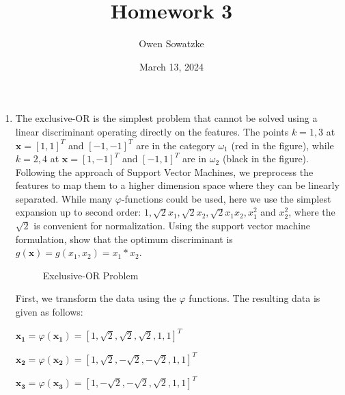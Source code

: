 \documentclass[fleqn]{article}
\title{Homework 3}
\author{Owen Sowatzke}
\date{March 13, 2024}
\newcommand{\zerodisplayskip}{
	\setlength{\abovedisplayskip}{0pt}%
	\setlength{\belowdisplayskip}{0pt}%
	\setlength{\abovedisplayshortskip}{0pt}%
	\setlength{\belowdisplayshortskip}{0pt}%
	\setlength{\mathindent}{0pt}}
\begin{document}
	\offinterlineskip
	\setlength{\lineskip}{12pt}
	\zerodisplayskip
	\maketitle
	
	\begin{enumerate}
		\item The exclusive-OR is the simplest problem that cannot be solved using a linear discriminant operating directly on the features. The points $k=1,3$ at $\mathbf{x} = [1,1]^T$ and $[-1,-1]^T$ are in the category $\omega_1$ (red in the figure), while $k=2,4$ at $\mathbf{x}=[1,-1]^T$ and $[-1,1]^T$ are in $\omega_2$ (black in the figure). Following the approach of Support Vector Machines, we preprocess the features to map them to a higher dimension space where they can be linearly separated. While many $\varphi$-functions could be used, here we use the simplest expansion up to second order: $1, \sqrt{2}x_1, \sqrt{2}x_2, \sqrt{2}x_1x_2, x_1^2$ and $x_2^2$, where the $\sqrt{2}$ is convenient for normalization. Using the support vector machine formulation, show that the optimum discriminant is $g(\mathbf{x}) = g(x_1,x_2) = x_1 * x_2$.
		
	\begin{figure}[H]
		\centerline{}
		\caption{Exclusive-OR Problem}
		\label{exclusive_or}
	\end{figure}
		
	First, we transform the data using the $\varphi$ functions. The resulting data is given as follows:
	
	$\mathbf{x_1} = \varphi(\mathbf{x_1}) = [1,\sqrt{2},\sqrt{2},\sqrt{2},1,1]^T$
	
	$\mathbf{x_2} = \varphi(\mathbf{x_2}) = [1,\sqrt{2},-\sqrt{2},-\sqrt{2},1,1]^T$
	
	$\mathbf{x_3} = \varphi(\mathbf{x_3}) = [1,-\sqrt{2},-\sqrt{2},\sqrt{2},1,1]^T$
	

\end{enumerate}
\end{document}
